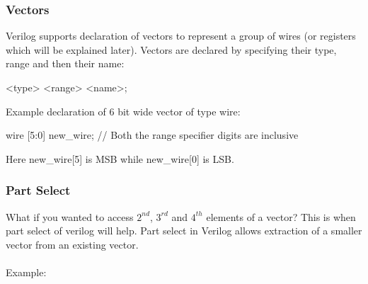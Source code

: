 \documentclass[a4paper,10pt]{article}
\theoremstyle{mytheor}
\newcommand{
  \insertverilog}[3]{
  
}
\begin{document}
\break
\insertverilog{./verilog_files/andGate4.v}{andGate4-wire}{\text{Use of wires to connect output of one module to input of another}}

\subsubsection*{Vectors}
Verilog supports declaration of vectors to represent a group of wires (or registers which will be explained later). Vectors are declared by specifying their type, range and then their name:
\begin{center}
  <type> <range> <name>;
\end{center}

Example declaration of 6 bit wide vector of type wire:
\begin{center}
  {\color{blue} wire} [{\color{orange}5}:{\color{orange}0}] new\_wire; {\color{vgreen}// Both the range specifier digits are inclusive}
\end{center}

Here new\_wire[{\color{orange}5}] is MSB while new\_wire[{\color{orange}0}] is LSB.

\subsubsection*{Part Select}
What if you wanted to access $2^{nd}$, $3^{rd}$ and $4^{th}$ elements of a vector? This is when part select of verilog will help. Part select in Verilog allows extraction of a smaller vector from an existing vector.\\ 
\vspace{0.2cm}\\
Example:
\insertverilog{./verilog_files/bitExtract.v}{bit-extract}{\text{Using bit extract to extract lower, higher and middle 16 bits from a 32 bit input}}
\end{document}
